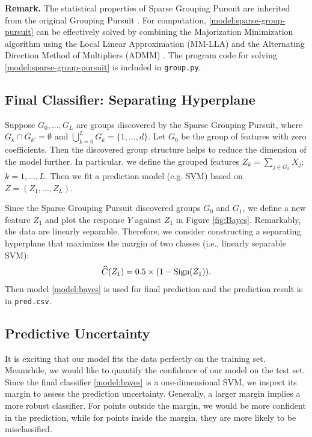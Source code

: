 \documentclass[11pt]{article}
\begin{document}
{\bf Remark.}
The statistical properties of Sparse Grouping Pursuit are inherited from the original Grouping Pursuit \cite{shen2010grouping}. 
For computation, \eqref{model:sparse-group-pursuit} can be effectively solved by
combining the Majorization Minimization algorithm \cite{hunter2000quantile} using the Local Linear Approximation \cite{zou2008one} (MM-LLA) and
the Alternating Direction Method of Multipliers (ADMM) \cite{boyd2011distributed}.
The program code for solving \eqref{model:sparse-group-pursuit} is included in \texttt{group.py}. 


\subsection{Final Classifier: Separating Hyperplane}

Suppose $G_0,\ldots, G_L$ are groups discovered by the Sparse Grouping Pursuit, 
where $G_{k}\cap G_{k'}=\emptyset$ and $\bigcup_{k=0}^{L}G_k = \{1,\ldots,d\}$. 
Let $G_0$ be the group of features with zero coefficients. 
Then the discovered group structure helps to reduce the dimension of the model further. In particular, we define the grouped features 
$Z_{k} = \sum_{j\in G_k} X_j$; $k=1,\ldots,L$.
Then we fit a prediction model (e.g. SVM) based on $Z=(Z_1,\ldots,Z_L)$. 


Since the Sparse Grouping Pursuit discovered groups $G_0$ and $G_1$, 
we define a new feature $Z_1$ and plot the response $Y$ against $Z_1$ in Figure \ref{fig:Bayes}. Remarkably, the data are linearly separable. 
Therefore, we consider constructing a separating hyperplane that maximizes the margin of two classes (i.e., linearly separable SVM):
\begin{equation}\label{model:bayes}
    \widehat C(Z_1) = 0.5\times (1 - \textnormal{Sign}(Z_1)).
\end{equation}
Then model \eqref{model:bayes} is used for final prediction and the prediction result is in \texttt{pred.csv}.

\subsection{Predictive Uncertainty}

It is exciting that our model fits the data perfectly on the training set. Meanwhile, we would like to quantify the confidence of our model on the test set. Since the final classifier \eqref{model:bayes} is a one-dimensional SVM, we inspect its margin to assess the prediction uncertainty. Generally, a larger margin implies a more robust classifier. For points outside the margin, we would be more confident in the prediction, while for points inside the margin, they are more likely to be misclassified.
\end{document}

